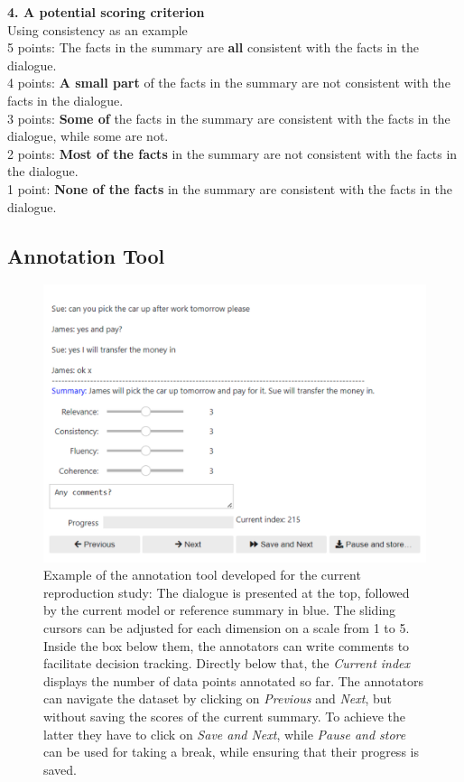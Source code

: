 \textbf{4. A potential scoring criterion}\\
Using consistency as an example\\
5 points: The facts in the summary are\textbf{ all} consistent with the facts in the dialogue.\\
4 points: \textbf{A small part} of the facts in the summary are not consistent with the facts in the dialogue.\\
3 points: \textbf{Some of} the facts in the summary are consistent with the facts in the dialogue, while some are not.\\
2 points: \textbf{Most of the facts} in the summary are not consistent with the facts in the dialogue.\\
1 point:\textbf{ None of the facts} in the summary are consistent with the facts in the dialogue.\\





\subsection{Annotation Tool}
\label{tool}


\begin{figure}[H]
    \centering
    \includegraphics[width=140mm]{tool.png}
    \caption{Example of the annotation tool developed for the current reproduction study: The dialogue is presented at the top, followed by the current model or reference summary in blue. The sliding cursors can be adjusted for each dimension on a scale from 1 to 5. Inside the box below them, the annotators can write comments to facilitate decision tracking. Directly below that, the \textit{Current index} displays the number of data points annotated so far. The annotators can navigate the dataset by clicking on \textleftarrow \textit{Previous} and \textrightarrow \textit{Next}, but without saving the scores of the current summary. To achieve the latter they have to click on \textit{Save and Next}, while \textit{Pause and store} can be used for taking a break, while ensuring that their progress is saved.}
    \label{fig:tool}
\end{figure}


